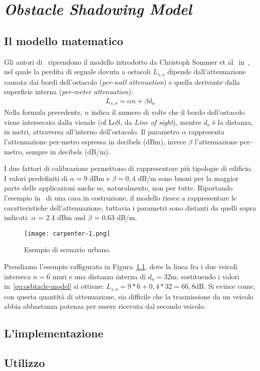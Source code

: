 %
\chapter{\textit{Obstacle Shadowing Model}}
\section{Il modello matematico}
Gli autori di~\cite{Carpenter:2015:OMI:2756509.2756512} riprendono il modello introdotto da Christoph Sommer et al.\ in~\cite{5720204},
nel quale la perdita di segnale dovuta a ostacoli $L_{s,o}$ dipende dall'attenuazione causata dai bordi dell'ostacolo (\textit{per-wall attenuation})
e quella derivante dalla superficie interna (\textit{per-meter attenuation}):
\begin{gather}\label{eq:osbtacle-model}
	L_{s,o} = \alpha n + \beta d_o
\end{gather}
Nella formula precedente, $n$ indica il numero di volte che il bordo dell'ostacolo viene intersecato dalla visuale (of LoS, da \textit{Line of sight}),
mentre $d_o$ è la distanza, in metri, attraversa all'interno dell'ostacolo.
Il parametro $\alpha$ rappresenta l'attenuazione per-metro espressa in decibels (dBm), invece
$\beta$ l'attenuazione per-metro, sempre in decibels  (dB/m).

I due fattori di calibrazione permettono di rappresentare più tipologie di edificio.
I valori predefiniti di $\alpha = 9$ dBm e $\beta = 0,4$ dB/m sono buoni per la maggior parte delle applicazioni
anche se, naturalmente, non per tutte.
Riportando l'esempio in~\cite{5720204} di una casa in costruzione, il modello riesce a rappresentare le caratteristiche dell'attenuazione,
tuttavia i parametri sono distanti da quelli sopra indicati: $\alpha$ = 2.4 dBm and $\beta$ = 0.63 dB/m.
%
\begin{figure}[!h]
	\centering
	\begin{center}
		\texttt{[image: carpenter-1.png]}
	\end{center}
	\label{fig:scenario-urbano-1}\caption{Esempio di scenario urbano.}
\end{figure}
%
Prendiamo l'esempio raffigurato in Figura~\ref{fig:scenario-urbano-1}, dove la linea fra i due veicoli interseca $n=6$ muri e una distanza interna di $d_o=32$m;
sostituendo i valori in~\ref{eq:osbtacle-model} si ottiene: $L_{s,o} = 9*6 + 0,4*32 = 66,8$dB.
Si evince come, con questa quantità di attenuazione, sia difficile che la trasmissione da un veicolo abbia abbastanza potenza per essere ricevuta dal secondo veicolo.
%
\section{L'implementazione}
%
\section{Utilizzo}
